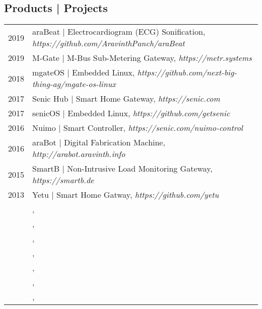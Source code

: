 \subsection{Products | Projects}
\begin{longtable}
	{r|p{13cm}}
	\textsc{2019} & araBeat | Electrocardiogram (ECG) Sonification, \emph{https://github.com/AravinthPanch/araBeat}\\
	\textsc{2019} & M-Gate | M-Bus Sub-Metering Gateway, \emph{https://metr.systems}\\
	\textsc{2018} & mgateOS | Embedded Linux, \emph{https://github.com/next-big-thing-ag/mgate-os-linux}\\
	\textsc{2017} & Senic Hub | Smart Home Gateway, \emph{https://senic.com}\\
	\textsc{2017} & senicOS | Embedded Linux, \emph{https://github.com/getsenic}\\
	\textsc{2016} & Nuimo | Smart Controller, \emph{https://senic.com/nuimo-control}\\
	\textsc{2016} & araBot | Digital Fabrication Machine, \emph{http://arabot.aravinth.info}\\
	\textsc{2015} & SmartB | Non-Intrusive Load Monitoring Gateway, \emph{https://smartb.de}\\
	\textsc{2013} & Yetu | Smart Home Gatway, \emph{https://github.com/yetu}\\
	\textsc{} & , \emph{}\\
	\textsc{} & , \emph{}\\
	\textsc{} & , \emph{}\\
	\textsc{} & , \emph{}\\
	\textsc{} & , \emph{}\\
	\textsc{} & , \emph{}\\
	\textsc{} & , \emph{}\\
\end{longtable}

